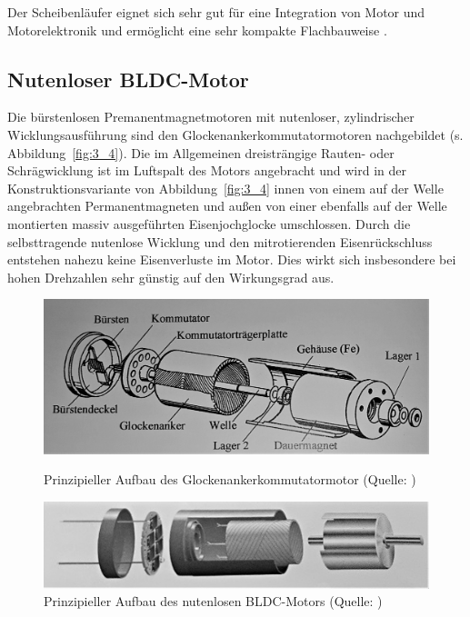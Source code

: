 Der Scheibenläufer eignet sich sehr gut für eine Integration von Motor und Motorelektronik und ermöglicht eine sehr kompakte Flachbauweise \parencite[S. 77--78]{Stölting2011}.

\subsection{Nutenloser BLDC-Motor}

Die bürstenlosen Premanentmagnetmotoren mit nutenloser, zylindrischer Wicklungsausführung sind den Glockenankerkommutatormotoren nachgebildet (s. Abbildung~\ref{fig:3_4}). Die im Allgemeinen dreisträngige Rauten- oder Schrägwicklung ist im Luftspalt des Motors angebracht und wird in der Konstruktionsvariante von Abbildung~\ref{fig:3_4} innen von einem auf der Welle angebrachten Permanentmagneten und außen von einer ebenfalls auf der Welle montierten massiv ausgeführten Eisenjochglocke umschlossen. Durch die selbsttragende nutenlose Wicklung und den mitrotierenden Eisenrückschluss entstehen nahezu keine Eisenverluste im Motor. Dies wirkt sich insbesondere bei hohen Drehzahlen sehr günstig auf den Wirkungsgrad aus.

\begin{figure}[h]
  \begin{minipage}{.48\linewidth}
    \centering
    \includegraphics[width=\textwidth]{./Grafiken/3_4}
    \caption[Prinzipieller Aufbau des Glockenankerkommutatormotor]{Prinzipieller Aufbau des Glockenankerkommutatormotor (Quelle: \parencite[S. 30]{Stölting2011})}%
    \label{fig:3_4}
  \end{minipage}\hfill%
  \begin{minipage}{.48\linewidth}
    \centering
    \includegraphics[width=\textwidth]{./Grafiken/3_5}
    \caption[Prinzipieller Aufbau des nutenlosen BLDC-Motors]{Prinzipieller Aufbau des nutenlosen BLDC-Motors (Quelle: \parencite[S. 78]{Stölting2011})}%
    \label{fig:3_5}
  \end{minipage}
\end{figure}

